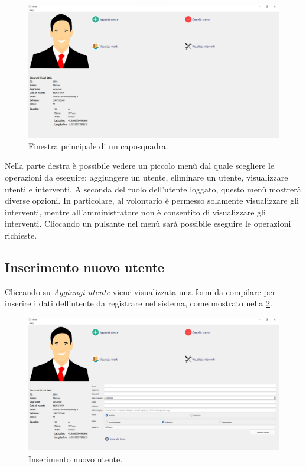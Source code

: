 \begin{figure}[h!]
	\centering
	\includegraphics[width=1\linewidth]{./ImageFiles/home_foreman}
	\caption{Finestra principale di un caposquadra.}
	\label{fig:home_foreman}
\end{figure}

Nella parte destra è possibile vedere un piccolo menù dal quale scegliere le operazioni da eseguire: aggiungere un utente, eliminare un utente, visualizzare utenti e interventi. A seconda del ruolo dell'utente loggato, questo menù mostrerà diverse opzioni. In particolare, al volontario è permesso solamente visualizzare gli interventi, mentre all'amministratore non è consentito di visualizzare gli interventi. Cliccando un pulsante nel menù sarà possibile eseguire le operazioni richieste.

\subsection{Inserimento nuovo utente}
Cliccando su \textit{Aggiungi utente} viene visualizzata una form da compilare per inserire i dati dell'utente da registrare nel sistema, come mostrato nella \Fig\ref{fig:new_user}. 
\begin{figure}[h!]
	\centering
	\includegraphics[width=1\linewidth]{./ImageFiles/new_user}
	\caption{Inserimento nuovo utente.}
	\label{fig:new_user}
\end{figure}


